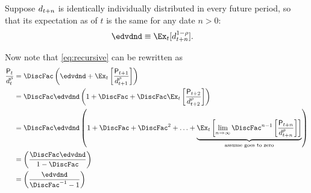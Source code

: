 \documentclass{\handout}
\begin{document}
Suppose $d_{t+n}$ is identically individually distributed in every future period, so that its expectation as of $t$ is the same for any date $n>0$:
\begin{equation}\begin{gathered}\begin{aligned}
  \edvdnd & \equiv  \Ex_{t}[\dvdnd_{t+n}^{1-\CRRA}].   \label{eq:dmod}
\end{aligned}\end{gathered}\end{equation}

Now note that \eqref{eq:recursive} can be rewritten as
\begin{equation}\begin{gathered}\begin{aligned}
  \frac{\Price_{t}}{\dvdnd_{t}^{\CRRA}}          & =  \DiscFac \left( \edvdnd + \Ex_{t}\left[\frac{\Price_{t+1}}{\dvdnd_{t+1}^{\CRRA}}\right] \right) 
\\ & =  \DiscFac \edvdnd \left(1 + \DiscFac + \DiscFac \Ex_{t}\left[\frac{\Price_{t+2}}{\dvdnd_{t+2}^{\CRRA}}\right]\right) 
\\ & =  \DiscFac \edvdnd \left(1 + \DiscFac  + \DiscFac^{2} + \ldots + \underbrace{\Ex_{t} \left[\lim_{n\rightarrow \infty}\DiscFac^{n-1}\left[\frac{\Price_{t+n}}{\dvdnd_{t+n}^{\CRRA}}\right]\right]}_{\text{assume goes to zero}}\right) 
\\ & =  \left(\frac{\DiscFac \edvdnd}{1-\DiscFac}\right)
\\ & =  \left(\frac{\edvdnd}{\DiscFac^{-1}-1}\right) \label{eq:PtCRRA}
\end{aligned}\end{gathered}\end{equation}
\end{document}
